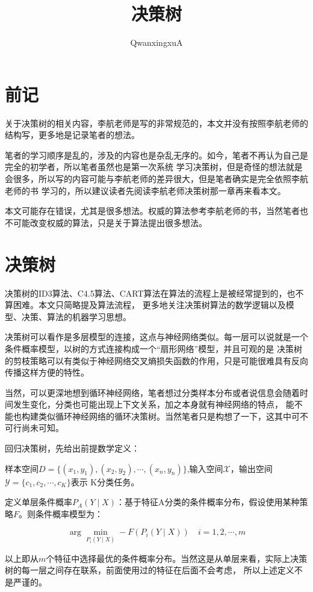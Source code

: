 \documentclass{article}
\title{决策树}
\author{QwanxingxuA}
\begin{document}
\maketitle

    \section*{前记}
        关于决策树的相关内容，李航老师是写的非常规范的，本文并没有按照李航老师的结构写，更多地是记录笔者的想法。
        
        笔者的学习顺序是乱的，涉及的内容也是杂乱无序的。如今，笔者不再认为自己是完全的初学者，所以笔者虽然也是第一次系统
        学习决策树，但是奇怪的想法就是会很多，所以写的内容可能与李航老师的差异很大，但是笔者确实是完全依照李航老师的书
        学习的，所以建议读者先阅读李航老师决策树那一章再来看本文。

        本文可能存在错误，尤其是很多想法。权威的算法参考李航老师的书，当然笔者也不可能改变权威的算法，只是关于算法提出很多想法。
    \section{决策树}
        决策树的ID3算法、C4.5算法、CART算法在算法的流程上是被经常提到的，也不算困难。本文只简略提及算法流程，
        更多地关注决策树算法的数学逻辑以及模型、决策、算法的机器学习思想。

        决策树可以看作是多层模型的连接，这点与神经网络类似。每一层可以说就是一个条件概率模型，以树的方式连接构成一个“扇形网络”模型，并且可观的是
        决策树的剪枝策略可以有类似于神经网络交叉熵损失函数的作用，只是可能很难具有反向传播这样方便的特性。
        
        当然，可以更深地想到循环神经网络，笔者想过分类样本分布或者说信息会随着时间发生变化，分类也可能出现上下文关系，加之本身就有神经网络的特点，
        能不能也构建类似循环神经网络的循环决策树。当然笔者只是构想了一下，这其中可不可行尚未可知。

        回归决策树，先给出前提数学定义：
        
        样本空间$D=\{(x_1,y_1),(x_2,y_2),\cdots,(x_n,y_n)\}$,输入空间$\mathcal{X} $，输出空间$\mathcal{Y}=\{c_1,c_2,\cdots,c_K\}$表示
        K分类任务。

        定义单层条件概率$P_A(Y\mid X)$：基于特征A分类的条件概率分布，假设使用某种策略$F$。则条件概率模型为：

        \[\arg\min_{P_i(Y \mid X)} -F(P_i(Y \mid X))\quad i=1,2,\cdots,m \]

        以上即从$m$个特征中选择最优的条件概率分布。当然这是从单层来看，实际上决策树的每一层之间存在联系，前面使用过的特征在后面不会考虑，
        所以上述定义不是严谨的。
\end{document}

